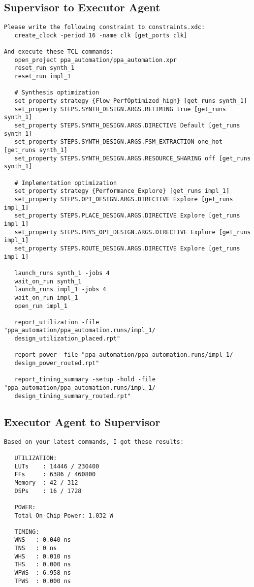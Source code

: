 \subsection{Supervisor to Executor Agent}
\vspace{-0.5em}
\begin{supervisorbox}
\begin{lstlisting}
Please write the following constraint to constraints.xdc:
   create_clock -period 16 -name clk [get_ports clk]
   
And execute these TCL commands:
   open_project ppa_automation/ppa_automation.xpr
   reset_run synth_1
   reset_run impl_1
   
   # Synthesis optimization
   set_property strategy {Flow_PerfOptimized_high} [get_runs synth_1]
   set_property STEPS.SYNTH_DESIGN.ARGS.RETIMING true [get_runs synth_1]
   set_property STEPS.SYNTH_DESIGN.ARGS.DIRECTIVE Default [get_runs synth_1]
   set_property STEPS.SYNTH_DESIGN.ARGS.FSM_EXTRACTION one_hot [get_runs synth_1]
   set_property STEPS.SYNTH_DESIGN.ARGS.RESOURCE_SHARING off [get_runs synth_1]
   
   # Implementation optimization
   set_property strategy {Performance_Explore} [get_runs impl_1]
   set_property STEPS.OPT_DESIGN.ARGS.DIRECTIVE Explore [get_runs impl_1]
   set_property STEPS.PLACE_DESIGN.ARGS.DIRECTIVE Explore [get_runs impl_1]
   set_property STEPS.PHYS_OPT_DESIGN.ARGS.DIRECTIVE Explore [get_runs impl_1]
   set_property STEPS.ROUTE_DESIGN.ARGS.DIRECTIVE Explore [get_runs impl_1]
   
   launch_runs synth_1 -jobs 4
   wait_on_run synth_1
   launch_runs impl_1 -jobs 4
   wait_on_run impl_1
   open_run impl_1
   
   report_utilization -file "ppa_automation/ppa_automation.runs/impl_1/
   design_utilization_placed.rpt"
   
   report_power -file "ppa_automation/ppa_automation.runs/impl_1/
   design_power_routed.rpt"
   
   report_timing_summary -setup -hold -file "ppa_automation/ppa_automation.runs/impl_1/
   design_timing_summary_routed.rpt"
\end{lstlisting}
\end{supervisorbox}

\subsection{Executor Agent to Supervisor}
\vspace{-0.5em}
\begin{reviewerbox}
\begin{lstlisting}
Based on your latest commands, I got these results:

   UTILIZATION:
   LUTs    : 14446 / 230400
   FFs     : 6386 / 460800
   Memory  : 42 / 312
   DSPs    : 16 / 1728

   POWER:
   Total On-Chip Power: 1.032 W

   TIMING:
   WNS   : 0.040 ns
   TNS   : 0 ns
   WHS   : 0.010 ns
   THS   : 0.000 ns
   WPWS  : 6.958 ns
   TPWS  : 0.000 ns

\end{lstlisting}
\end{reviewerbox}

